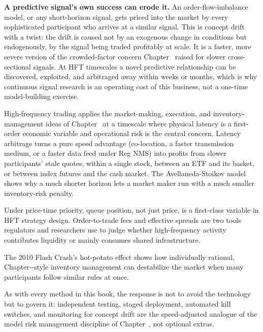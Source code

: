 \documentclass[../ai_in_finance]{subfiles}
\begin{document}
\textbf{A predictive signal's own success can erode it.} An order-flow-imbalance model, or any short-horizon signal, gets priced into the market by every sophisticated participant who arrives at a similar signal. This is concept drift with a twist: the drift is caused not by an exogenous change in conditions but endogenously, by the signal being traded profitably at scale. It is a faster, more severe version of the crowded-factor concern Chapter~ raised for slower cross-sectional signals. At HFT timescales a novel predictive relationship can be discovered, exploited, and arbitraged away within weeks or months, which is why continuous signal research is an operating cost of this business, not a one-time model-building exercise.


High-frequency trading applies the market-making, execution, and inventory-management ideas of Chapter~ at a timescale where physical latency is a first-order economic variable and operational risk is the central concern. Latency arbitrage turns a pure speed advantage (co-location, a faster transmission medium, or a faster data feed under Reg NMS) into profits from slower participants' stale quotes, within a single stock, between an ETF and its basket, or between index futures and the cash market. The Avellaneda-Stoikov model shows why a much shorter horizon lets a market maker run with a much smaller inventory-risk penalty.

Under price-time priority, queue position, not just price, is a first-class variable in HFT strategy design. Order-to-trade fees and effective spreads are two tools regulators and researchers use to judge whether high-frequency activity contributes liquidity or mainly consumes shared infrastructure.

The 2010 Flash Crash's hot-potato effect shows how individually rational, Chapter--style inventory management can destabilize the market when many participants follow similar rules at once.

As with every method in this book, the response is not to avoid the technology but to govern it: independent testing, staged deployment, automated kill switches, and monitoring for concept drift are the speed-adjusted analogue of the model risk management discipline of Chapter~, not optional extras.

\end{document}
